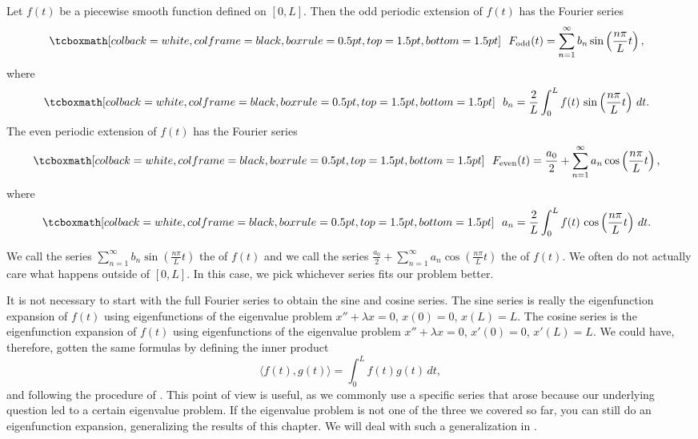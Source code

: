 \begin{theorem}
Let $f(t)$ be a piecewise smooth function defined on $[0,L]$.
Then the odd periodic extension
of $f(t)$ has the Fourier series
\begin{equation*}
\mybxbg{~~
F_{\text{odd}}(t) = \sum_{n=1}^\infty b_n \sin \left( \frac{n \pi}{L} t
\right) ,
~~}
\end{equation*}
where
\begin{equation*}
\mybxbg{~~
b_n = 
\frac{2}{L} \int_{0}^L f(t)\, \sin \left( \frac{n \pi}{L} t \right) \, dt .
~~}
\end{equation*}
The even periodic extension of $f(t)$ has the Fourier series
\begin{equation*}
\mybxbg{~~
F_{\text{even}}(t) = \frac{a_0}{2} + \sum_{n=1}^\infty a_n \cos \left(
\frac{n \pi}{L} t \right) ,
~~}
\end{equation*}
where
\begin{equation*}
\mybxbg{~~
a_n = 
\frac{2}{L} \int_{0}^L f(t)\, \cos \left( \frac{n \pi}{L} t \right) \, dt .
~~}
\end{equation*}
\end{theorem}

We call the series $\sum_{n=1}^\infty b_n \sin \left( \frac{n \pi}{L} t\right)$ 
the \emph{} of $f(t)$ and we call the series
$\frac{a_0}{2} + \sum_{n=1}^\infty a_n \cos \left( \frac{n \pi}{L} t
\right)$
the \emph{} of $f(t)$.  
We often do not actually care what happens outside of $[0,L]$.  In this case,
we pick whichever series fits our problem better.

It is not necessary to start with the full Fourier series to obtain
the sine and cosine series.
The sine series is really the eigenfunction expansion of $f(t)$ using 
eigenfunctions of the eigenvalue problem $x''+\lambda x = 0$, $x(0) = 0$,
$x(L) = L$.  The cosine series is the eigenfunction expansion of $f(t)$
using 
eigenfunctions of the eigenvalue problem $x''+\lambda x = 0$, $x'(0) = 0$,
$x'(L) = L$.  We could have, therefore, gotten the same formulas
by defining the inner product
\begin{equation*}
\langle f(t), g(t) \rangle = \int_0^L f(t) g(t) \, dt ,
\end{equation*}
and following the procedure of .  This point of view is
useful, as we commonly use a specific series that arose because our underlying
question 
led to a certain eigenvalue problem.  If the eigenvalue 
problem is not one of the three we covered so far, you can still do an
eigenfunction expansion, generalizing the results of this chapter.  We will
deal with such a generalization in .

